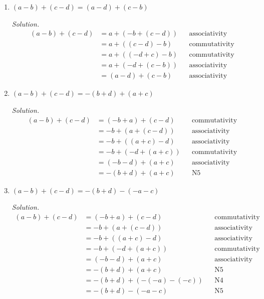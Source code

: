 \documentclass[11pt]{article}
\begin{document}
\begin{enumerate}
  \item $(a - b) + (c - d) = (a - d) + (c - b)$

    \emph{Solution.}
    \begin{align*}
      (a - b) + (c - d)
        &= a + (-b + (c - d)) && \text{associativity} \\
        &= a + ((c - d) - b) && \text{commutativity} \\
        &= a + ((-d + c) - b) && \text{commutativity} \\
        &= a + (-d + (c - b)) && \text{associativity} \\
        &= (a - d) + (c - b) && \text{associativity}
    \end{align*}

  \item $(a - b) + (c - d) = -(b + d) + (a + c)$

    \emph{Solution.}
    \begin{align*}
      (a - b) + (c - d)
        &= (-b + a) + (c - d) && \text{commutativity} \\
        &= -b + (a + (c - d)) && \text{associativity} \\
        &= -b + ((a + c) - d) && \text{associativity} \\
        &= -b + (-d + (a + c)) && \text{commutativity} \\
        &= (-b - d) + (a + c) && \text{associativity} \\
        &= -(b + d) + (a + c) && \text{N5}
    \end{align*}

  \item $(a - b) + (c - d) = -(b + d) - (-a - c)$

    \emph{Solution.}
    \begin{align*}
      (a - b) + (c - d)
        &= (-b + a) + (c - d) && \text{commutativity} \\
        &= -b + (a + (c - d)) && \text{associativity} \\
        &= -b + ((a + c) - d) && \text{associativity} \\
        &= -b + (-d + (a + c)) && \text{commutativity} \\
        &= (-b - d) + (a + c) && \text{associativity} \\
        &= -(b + d) + (a + c) && \text{N5} \\
        &= -(b + d) + (-(-a) - (-c)) && \text{N4} \\
        &= -(b + d) - (-a - c) && \text{N5}
    \end{align*}


\end{enumerate}
\end{document}
